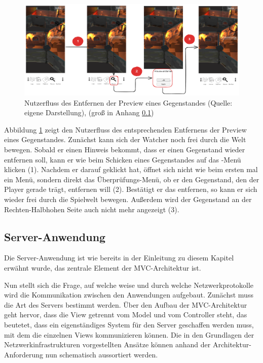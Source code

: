 \begin{figure}[ht]
\centering
\includegraphics[width=1\linewidth]{content/pictures/RemovePreviewFlow.png}
\caption{Nutzerfluss des Entfernen der Preview eines Gegenstandes (Quelle: eigene Darstellung), (groß in Anhang \ref{})}
\label{fig:userflow-remove-preview-cm}
\end{figure}

Abbildung \ref{fig:userflow-remove-preview-cm} zeigt den Nutzerfluss des entsprechenden Entfernens der Preview eines Gegenstandes. Zunächst kann sich der Watcher noch frei durch die Welt bewegen. Sobald er einen Hinweis bekommt, dass er einen Gegenstand wieder entfernen soll, kann er wie beim Schicken eines Gegenstandes auf das -Menü klicken (1). Nachdem er darauf geklickt hat, öffnet sich nicht wie beim ersten mal ein Menü, sondern direkt das Überprüfungs-Menü, ob er den Gegenstand, den der Player gerade trägt, entfernen will (2). Bestätigt er das entfernen, so kann er sich wieder frei durch die Spielwelt bewegen. Außerdem wird der Gegenstand an der Rechten-Halbhohen Seite auch nicht mehr angezeigt (3). 


\subsection{Server-Anwendung}
Die Server-Anwendung ist wie bereits in der Einleitung zu diesem Kapitel erwähnt wurde, das zentrale Element der \ac{MVC}-Architektur ist. 

Nun stellt sich die Frage, auf welche weise und durch welche Netzwerkprotokolle wird die Kommunikation zwischen den Anwendungen aufgebaut. Zunächst muss die Art des Servers bestimmt werden. Über den Aufbau der \ac{MVC}-Architektur geht hervor, dass die View getrennt vom Model und vom Controller steht, das beutetet, dass ein eigenständiges System für den Server geschaffen werden muss, mit dem die einzelnen Views kommunizieren können. Die in den Grundlagen der Netzwerkinfrastrukturen vorgestellten Ansätze können anhand der Architektur-Anforderung nun schematisch aussortiert werden. 

